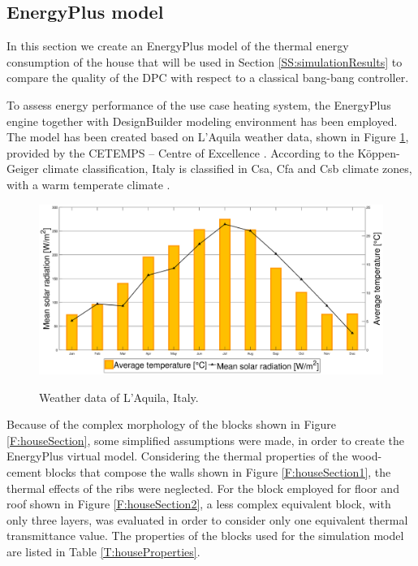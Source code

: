\subsection{EnergyPlus model}\label{SS:energyPlusmodel}
In this section we create an EnergyPlus model of the thermal energy consumption of the house that will be used in Section \ref{SS:simulationResults} to compare the quality of the DPC with respect to a classical bang-bang controller.

To assess energy performance of the use case heating system, the EnergyPlus engine together with DesignBuilder modeling environment has been employed. The model has been created based  on L'Aquila weather data, shown in Figure \ref{F:houseExternalWeather}, provided by the CETEMPS – Centre of Excellence \cite{CETEMPS}. According to the K\"{o}ppen-Geiger climate classification, Italy is classified in Csa, Cfa and Csb climate zones, with a warm temperate climate \cite{Peel2007}.

\begin{figure}[h!]
	\begin{center}
		\includegraphics[width=30pc]{figures/dati_climatici_rev01.eps}
		\caption{Weather data of L'Aquila, Italy.}
		\captionsetup{justification=centering}
		\label{F:houseExternalWeather}
	\end{center}
\end{figure}

Because of the complex morphology of the blocks shown in Figure \ref{F:houseSection}, some simplified assumptions were made, in order to create the EnergyPlus virtual model. Considering the thermal properties of the wood-cement blocks that compose the walls shown in Figure \ref{F:houseSection1}, the thermal effects of the ribs were neglected. For the block employed for floor and roof shown in Figure \ref{F:houseSection2}, a less complex equivalent block, with only three layers, was evaluated in order to consider only one equivalent thermal transmittance value. The properties of the blocks used for the simulation model are listed in Table \ref{T:houseProperties}.    

